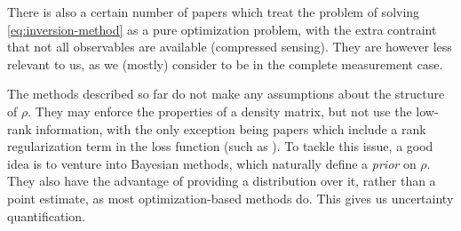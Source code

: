 \documentclass[12pt]{memoir}
\begin{document}
There is also a certain number of papers \cite{meth:CS:GLFSBE10,meth:CS:Gross-2011, meth:CS:Flammia-2012,meth:CS:Koltchinskii-2011} which treat the problem of solving \ref{eq:inversion-method} as a pure optimization problem, with the extra contraint that not all observables are available (compressed sensing). They are however less relevant to us, as we (mostly) consider to be in the complete measurement case.\medbreak

The methods described so far do not make any assumptions about the structure of $\rho$. They may enforce the properties of a density matrix, but not use the low-rank information, with the only exception being papers which include a rank regularization term in the loss function (such as \cite{meth:linear-inversion:alquier}). To tackle this issue, a good idea is to venture into Bayesian methods, which naturally define a \textit{prior} on $\rho$. They also have the advantage of providing a distribution over it, rather than a point estimate, as most optimization-based methods do. This gives us uncertainty quantification.\medbreak
\end{document}
